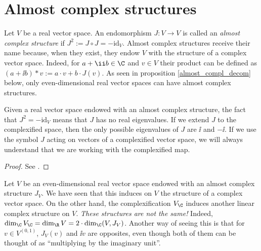 \section{Almost complex structures} \label{appendix_almost_complex_structure}
Let \(V\) be a real vector space. An endomorphism \(J\colon V \to V\) is called an \textit{almost complex structure} if \(J^2:= J \circ J=-\mathrm{id}_V\). Almost complex structures receive their name because, when they exist, they endow \(V\) with the structure of a complex vector space. Indeed, for \(a+\ii b \in \C\) and \(v \in V\) their product can be defined as \((a+ \ii b)*v:=a \cdot  v+ b\cdot  J(v)\). As seen in proposition \ref{almost_compl_decom} below, only even-dimensional real vector spaces can have almost complex structures. 

Given a real vector space endowed with an almost complex structure, the fact that \(J^2=-\mathrm{id}_V\) means that \(J\) has no real eigenvalues. If we extend \(J\) to the complexified space, then the only possible eigenvalues of \(J\) are \(\ii\) and \(-\ii\). If we use the symbol \(J\) acting on vectors of a complexified vector space, we will always understand that we are working with the complexified map.

\begin{proof}
    See \parencite[Prop. 1.52]{lee_introCM}. 
\end{proof}

\begin{obs}
    Let \(V\) be an even-dimensional real vector space endowed with an almost complex structure \(J_V\). We have seen that this induces on \(V\) the structure of a complex vector space. On the other hand, the complexification \(V_\C\) induces another linear complex structure on \(V\). \textit{These structures are not the same!} Indeed, \(\dim_\C V_\C=\dim_\R V=2\cdot \dim_\C(V,J_V)\). Another way of seeing this is that for \(v\in V^{(0,1)}\), \(J_V(v)\) and \(\ii v\) are opposites, even though both of them can be thought of as ``multiplying by the imaginary unit''.
\end{obs}

